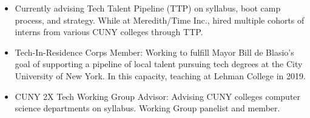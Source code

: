\documentclass[a4paper,10pt]{memoir} %
\begin{document}
\userinformation %

\framebreak %








\begin{itemize}
	\item Currently advising Tech Talent Pipeline (TTP) on syllabus, boot camp process, and strategy. While at Meredith/Time Inc., hired multiple cohorts of interns from various CUNY colleges through TTP. 
	\item Tech-In-Residence Corps Member: Working to fulfill Mayor Bill de Blasio’s goal of supporting a pipeline of local talent pursuing tech degrees at the City University of New York. In this capacity, teaching at Lehman College in 2019.
	\item CUNY 2X Tech Working Group Advisor: Advising CUNY colleges computer science departments on syllabus. Working Group panelist and member.
\end{itemize}
\end{document}
